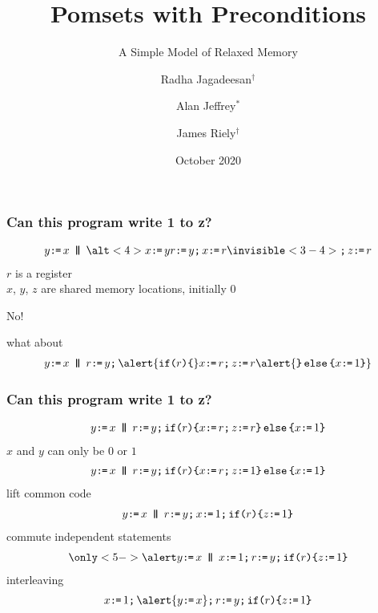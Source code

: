 \documentclass[t,aspectratio=169]{beamer} %
\title{Pomsets with Preconditions}
\subtitle{A Simple Model of Relaxed Memory}
\author{Radha Jagadeesan$^\dagger$ \and Alan Jeffrey$^*$ \and James Riely$^\dagger$}
\date{October 2020}
\institute{$^\dagger$DePaul University \and $^*$Mozilla Research and the Servo Project}
\begin{document}
\begin{frame}
  \maketitle
\end{frame}

\begin{frame}
  \frametitle{Can this program write 1 to z?}
  \begin{gather*}
    y\GETS x
    \PAR
    \alt<4>{x\GETS y}{r\GETS y \SEMI x\GETS r}
    \invisible<3-4>{\SEMI z\GETS r}
  \end{gather*}
  $r$ is a register\\
  $x$, $y$, $z$ are shared memory locations, initially $0$

  \bigskip \bigskip
  No!
  
  \bigskip \bigskip
  what about
  \begin{gather*}
    y\GETS x
    \PAR
    r\GETS y\SEMI
    \alert{\IF{r}\THEN} x\GETS r\SEMI z\GETS r \alert{\ELSE x\GETS1 \FI}
  \end{gather*}
\end{frame}

\begin{frame}
  \frametitle{Can this program write 1 to z?}
  \begin{gather*}
    y\GETS x
    \PAR
    r\GETS y\SEMI
    \IF{r}\THEN x\GETS r\SEMI z\GETS r \ELSE x\GETS1 \FI
  \end{gather*}
  \pause
  $x$ and $y$ can only be $0$ or $1$  
  \begin{gather*}
    y\GETS x
    \PAR
    r\GETS y\SEMI
    \IF{r}\THEN x\GETS r\SEMI z\GETS 1 \ELSE x\GETS1 \FI
  \end{gather*}
  \pause
  lift common code
  \begin{gather*}
    y\GETS x
    \PAR
    r\GETS y\SEMI
    x\GETS1\SEMI
    \IF{r}\THEN z\GETS 1 \FI
  \end{gather*}
  \pause
  commute independent statements
  \begin{gather*}
    \only<5->{\alert}{y\GETS x}
    \PAR
    x\GETS1\SEMI
    r\GETS y\SEMI
    \IF{r}\THEN z\GETS 1 \FI
  \end{gather*}
  \pause
  interleaving
  \begin{gather*}
    x\GETS1\SEMI
    \alert{y\GETS x}\SEMI
    r\GETS y\SEMI
    \IF{r}\THEN z\GETS 1 \FI
  \end{gather*}
\end{frame}
\end{document}
